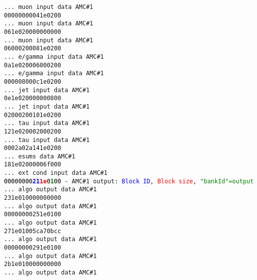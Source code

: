 \texttt{... muon input data AMC\#1}\\
\texttt{00000000041e0200}\\
\texttt{... muon input data AMC\#1}\\
\texttt{061e020000000000}\\
\texttt{... muon input data AMC\#1}\\
\texttt{06000200081e0200}\\
\texttt{... e/gamma input data AMC\#1}\\
\texttt{0a1e020006000200}\\
\texttt{... e/gamma input data AMC\#1}\\
\texttt{000008000c1e0200}\\
\texttt{... jet input data AMC\#1}\\
\texttt{0e1e020000000800}\\
\texttt{... jet input data AMC\#1}\\
\texttt{02000200101e0200}\\
\texttt{... tau input data AMC\#1}\\
\texttt{121e020002000200}\\
\texttt{... tau input data AMC\#1}\\
\texttt{0002a02a141e0200}\\
\texttt{... esums data AMC\#1}\\
\texttt{181e02000006f000}\\
\texttt{... ext cond input data AMC\#1}\\
\texttt{\textcolor{black}{00000000}\textcolor{blue}{\textbf{21}}\textcolor{red}{\textbf{1e}}\textcolor{black}{0}\textcolor{green}{\textbf{1}}\textcolor{black}{00} - AMC\#1 output: \textcolor{blue}{Block ID}, \textcolor{red}{Block size}, \textcolor{green}{"bankId"=output}}\\
\texttt{... algo output data AMC\#1}\\
\texttt{231e010000000000}\\
\texttt{... algo output data AMC\#1}\\
\texttt{00000000251e0100}\\
\texttt{... algo output data AMC\#1}\\
\texttt{271e01005ca70bcc}\\
\texttt{... algo output data AMC\#1}\\
\texttt{00000000291e0100}\\
\texttt{... algo output data AMC\#1}\\
\texttt{2b1e010000000000}\\
\texttt{... algo output data AMC\#1}\\
